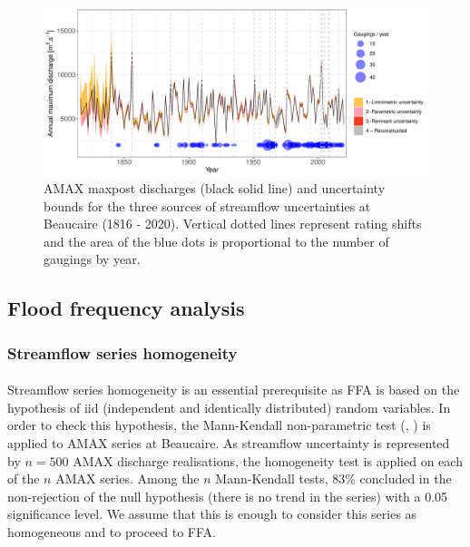 \documentclass[11pt]{article}
\begin{document}
    \begin{figure}[h!]
        \centering
        \includegraphics[width=\textwidth]{Figs/9-IC_AMAX_Both.pdf}
        \caption{AMAX maxpost discharges (black solid line) and uncertainty bounds for the three sources of streamflow uncertainties at Beaucaire (1816 - 2020). Vertical dotted lines represent rating shifts and the area of the blue dots is proportional to the number of gaugings by year.}
        \label{fig:ICtot_both}
    \end{figure}
    
   
    \subsection{Flood frequency analysis}
    
        \subsubsection{Streamflow series homogeneity}
           
        \paragraph{}
        Streamflow series homogeneity is an essential prerequisite as FFA is based on the hypothesis of iid (independent and identically distributed) random variables. In order to check this hypothesis, the Mann-Kendall non-parametric test (\citet{mann_nonparametric_1945}, \citet{kendall_rank_1948}) is applied to AMAX series at Beaucaire. As streamflow uncertainty is represented by $n = 500$ AMAX discharge realisations, the homogeneity test is applied on each of the $n$ AMAX series. Among the $n$ Mann-Kendall tests, 83\% concluded in the non-rejection of the null hypothesis (there is no trend in the series) with a 0.05 significance level. We assume that this is enough to consider this series as homogeneous and to proceed to FFA. 
        
\end{document}
